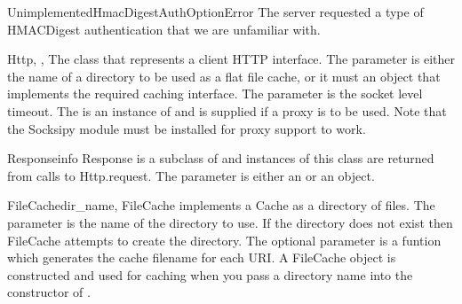 \begin{excdesc}{UnimplementedHmacDigestAuthOptionError}
The server requested a type of HMACDigest authentication that we
are unfamiliar with.
\end{excdesc}

%

\begin{classdesc}{Http}{, , }
The class that represents a client HTTP interface.
The  parameter is either the name of a directory
to be used as a flat file cache, or it must an object that 
implements the required caching interface.
The  parameter is the socket level timeout.
The  is an instance of  and is supplied
if a proxy is to be used. Note that the Socksipy module must be
installed for proxy support to work.
\end{classdesc}

\begin{classdesc}{Response}{info}
Response is a subclass of  and instances of this 
class are returned from calls
to Http.request. The  parameter is either 
an  or an  object.
\end{classdesc}

\begin{classdesc}{FileCache}{dir_name, }
FileCache implements a Cache as a directory of files.
The  parameter is
the name of the directory to use. If the directory does
not exist then FileCache attempts to create the directory.
The optional  parameter is a funtion which generates
the cache filename for each URI. A FileCache object is 
constructed and used for caching when you pass a directory name
into the constructor of .
\end{classdesc}

